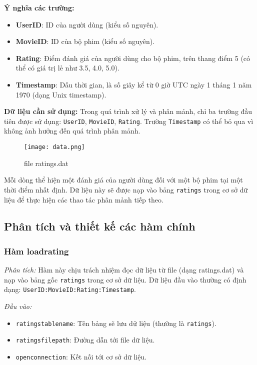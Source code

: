 \documentclass[14pt]{extarticle}
\begin{document}
\textbf{Ý nghĩa các trường:}
\begin{itemize}
    \item \textbf{UserID}: ID của người dùng (kiểu số nguyên).
    \item \textbf{MovieID}: ID của bộ phim (kiểu số nguyên).
    \item \textbf{Rating}: Điểm đánh giá của người dùng cho bộ phim, trên thang điểm 5 (có thể có giá trị lẻ như 3.5, 4.0, 5.0).
    \item \textbf{Timestamp}: Dấu thời gian, là số giây kể từ 0 giờ UTC ngày 1 tháng 1 năm 1970 (dạng Unix timestamp).
\end{itemize}

\textbf{Dữ liệu cần sử dụng:}  
Trong quá trình xử lý và phân mảnh, chỉ ba trường đầu tiên được sử dụng: \texttt{UserID}, \texttt{MovieID}, \texttt{Rating}. Trường \texttt{Timestamp} có thể bỏ qua vì không ảnh hưởng đến quá trình phân mảnh.
\begin{figure}[H]
    \centering
    \texttt{[image: data.png]}
    \caption{file ratings.dat}

\end{figure}

Mỗi dòng thể hiện một đánh giá của người dùng đối với một bộ phim tại một thời điểm nhất định. Dữ liệu này sẽ được nạp vào bảng \texttt{ratings} trong cơ sở dữ liệu để thực hiện các thao tác phân mảnh tiếp theo.

\subsection{Phân tích và thiết kế các hàm chính}
\subsubsection{Hàm loadrating}

\textit{Phân tích:}  
Hàm này chịu trách nhiệm đọc dữ liệu từ file (dạng ratings.dat) và nạp vào bảng gốc \texttt{ratings} trong cơ sở dữ liệu. Dữ liệu đầu vào thường có định dạng: \texttt{UserID:MovieID:Rating:Timestamp}.

\textit{Đầu vào:}
\begin{itemize}
    \item \texttt{ratingstablename}: Tên bảng sẽ lưu dữ liệu (thường là \texttt{ratings}).
    \item \texttt{ratingsfilepath}: Đường dẫn tới file dữ liệu.
    \item \texttt{openconnection}: Kết nối tới cơ sở dữ liệu.
\end{itemize}
\end{document}
